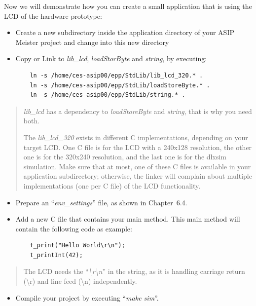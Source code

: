 Now we will demonstrate how you can create a small application that is
using the LCD of the hardware prototype:
\begin{itemize}
\item
  Create a new subdirectory inside the application directory of your
  ASIP Meister project and change into this new directory
\item
  Copy or Link to \emph{lib\_lcd}, \emph{loadStorByte} and
  \emph{string}, by executing:
\begin{lstlisting}
	ln -s /home/ces-asip00/epp/StdLib/lib_lcd_320.* .
	ln -s /home/ces-asip00/epp/StdLib/loadStoreByte.* .
	ln -s /home/ces-asip00/epp/StdLib/string.* .	
\end{lstlisting}
\end{itemize}
\begin{quote}
\emph{lib\_lcd} has a dependency to \emph{loadStoreByte} and
\emph{string}, that is why you need both.

The \emph{lib\_lcd\_320} exists in different C implementations,
depending on your target LCD. One C file is for the LCD with a 240x128
resolution, the other one is for the 320x240 resolution, and the last
one is for the dlxsim simulation. Make sure that at most, one of these C
files is available in your application subdirectory; otherwise, the
linker will complain about multiple implementations (one per C file) of
the LCD functionality.
\end{quote}

\begin{itemize}
\item
  Prepare an ``\emph{env\_settings}'' file, as shown in Chapter~6.4.
\item
  Add a new C file that contains your main method. This main method will
  contain the following code as example:
  \begin{lstlisting}
 	t_print("Hello World\r\n");
 	t_printInt(42);
  \end{lstlisting}
\end{itemize}
\begin{quote}
The LCD needs the ``\emph{\textbackslash r\textbackslash n}'' in the
string, as it is handling carriage return (\textbackslash r) and line
feed (\textbackslash n) independently.
\end{quote}

\begin{itemize}
\item
  Compile your project by executing ``\emph{make sim}''.
\end{itemize}

